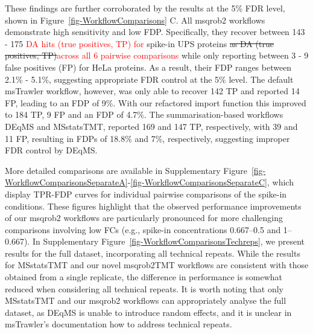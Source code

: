 \documentclass[
  letterpaper,
  DIV=11,
  numbers=noendperiod]{scrartcl}
\begin{document}
These findings are further corroborated by the results at the 5\% FDR
level, shown in Figure~\ref{fig-WorkflowComparisons} C. All msqrob2
workflows demonstrate high sensitivity and low FDP. Specifically, they
recover between 143 - 175
\textcolor{red}{DA hits (true positives, TP) for} spike-in UPS proteins
\sout{as DA (true positives, TP)}\textcolor{red}{across all 6 pairwise comparisons}
while only reporting between 3 - 9 false positives (FP) for HeLa
proteins. As a result, their FDP ranges between 2.1\% - 5.1\%,
suggesting appropriate FDR control at the 5\% level. The default
msTrawler workflow, however, was only able to recover 142 TP and
reported 14 FP, leading to an FDP of 9\%. With our refactored import
function this improved to 184 TP, 9 FP and an FDP of 4.7\%. The
summarisation-based workflows DEqMS and MSstatsTMT, reported 169 and 147
TP, respectively, with 39 and 11 FP, resulting in FDPs of 18.8\% and
7\%, respectively, suggesting improper FDR control by DEqMS.

More detailed comparisons are available in Supplementary
Figure~\ref{fig-WorkflowComparisonsSeparateA}-\ref{fig-WorkflowComparisonsSeparateC},
which display TPR-FDP curves for individual pairwise comparisons of the
spike-in conditions. These figures highlight that the observed
performance improvements of our msqrob2 workflows are particularly
pronounced for more challenging comparisons involving low FCs (e.g.,
spike-in concentrations 0.667--0.5 and 1--0.667). In Supplementary
Figure~\ref{fig-WorkflowComparisonsTechreps}, we present results for the
full dataset, incorporating all technical repeats. While the results for
MSstatsTMT and our novel msqrob2TMT workflows are consistent with those
obtained from a single replicate, the difference in performance is
somewhat reduced when considering all technical repeats. It is worth
noting that only MSstatsTMT and our msqrob2 workflows can appropriately
analyse the full dataset, as DEqMS is unable to introduce random
effects, and it is unclear in msTrawler's documentation how to address
technical repeats.
\end{document}
